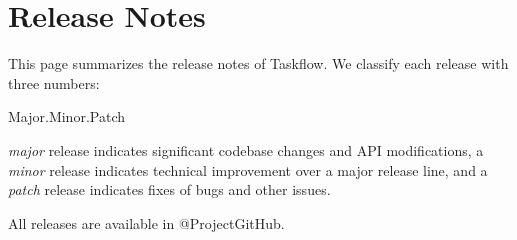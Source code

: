 \chapter{Release Notes}
\hypertarget{_releases}{}\label{_releases}
This page summarizes the release notes of Taskflow. We classify each release with three numbers\+:

{\ttfamily Major.\+Minor.\+Patch}

 {\itshape major} release indicates significant codebase changes and API modifications, a {\itshape minor} release indicates technical improvement over a major release line, and a {\itshape patch} release indicates fixes of bugs and other issues.

All releases are available in @\+Project\+Git\+Hub.


